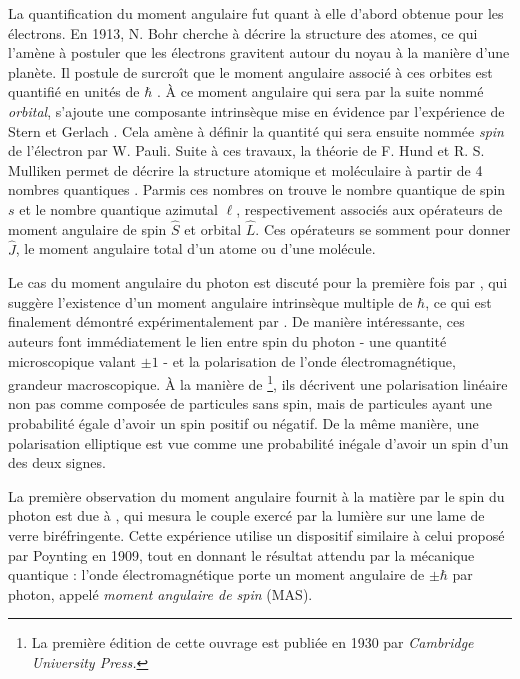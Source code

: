 La quantification du moment angulaire fut quant à elle d'abord obtenue pour les électrons. En 1913, N. Bohr cherche à décrire la structure des atomes, ce qui l'amène à postuler que les électrons gravitent autour du noyau à la manière d'une planète. Il postule de surcroît que le moment angulaire associé à ces orbites est quantifié en unités de $\hbar$ . \`A ce moment angulaire qui sera par la suite nommé \textit{orbital}, s'ajoute une composante intrinsèque mise en évidence par l'expérience de Stern et Gerlach . Cela amène  à définir la quantité qui sera ensuite nommée \textit{spin} de l'électron par W. Pauli. Suite à ces travaux, la théorie de F. Hund et R. S. Mulliken permet de décrire la structure atomique et moléculaire à partir de 4 nombres quantiques . Parmis ces nombres on trouve le nombre quantique de spin $s$ et le nombre quantique azimutal $\ell$, respectivement associés aux opérateurs de moment angulaire de spin $\hat{S}$ et orbital $\hat{L}$. Ces opérateurs se somment pour donner $\hat{J}$, le moment angulaire total d'un atome ou d'une molécule.

Le cas du moment angulaire du photon est discuté pour la première fois par , qui suggère l'existence d'un moment angulaire intrinsèque multiple de $\hbar$, ce qui est finalement démontré expérimentalement par . De manière intéressante, ces auteurs font immédiatement le lien entre spin du photon - une quantité microscopique valant $\pm 1$ - et la polarisation de l'onde électromagnétique, grandeur macroscopique. \`A la manière de \footnote{La première édition de cette ouvrage est publiée en 1930 par \textit{Cambridge University Press.}}, ils décrivent une polarisation linéaire non pas comme composée de particules sans spin, mais de particules ayant une probabilité égale d'avoir un spin positif ou négatif. De la même manière, une polarisation elliptique est vue comme une probabilité inégale d'avoir un spin d'un des deux signes.   

La première observation du moment angulaire fournit à la matière par le spin du photon est due à , qui mesura le couple exercé par la lumière sur une lame de verre biréfringente. Cette expérience utilise un dispositif similaire à celui proposé par Poynting en 1909, tout en donnant le résultat attendu par la mécanique quantique : l'onde électromagnétique porte un moment angulaire de $\pm\hbar$ par photon, appelé \textit{moment angulaire de spin} (MAS).

